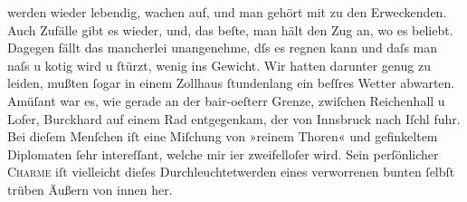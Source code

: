                werden wieder lebendig, wachen auf, und man gehört mit zu den Erweckenden. Auch
               Zufälle gibt es wieder, und, das beſte, man hält den Zug an, wo es beliebt. {\pb}Dagegen fällt das mancherlei unangenehme, dſs es regnen
               kann und daſs man naſs u kotig wird u ſtürzt, wenig ins Gewicht. Wir hatten darunter
               genug zu leiden, mußten ſogar in einem Zollhaus ſtundenlang ein beſſres Wetter
               abwarten. Amüſant war es, wie gerade an der bair-oeſterr Grenze, zwiſchen Reichenhall u Lofer, Burckhard auf einem Rad
               entgegenkam, der von Innsbruck nach Iſchl fuhr. Bei dieſem Menſchen iſt eine Miſchung
               von »reinem Thoren« und gefinkeltem Diplomaten ſehr intereſſant, welche mir i{\geminationm}er zweifelloſer {\pb}wird. Sein
               perſönlicher \textsc{Charme} iſt vielleicht dieſes
               Durchleuchtetwerden eines verworrenen bunten ſelbſt trüben Äußern von innen her.\pend
           

